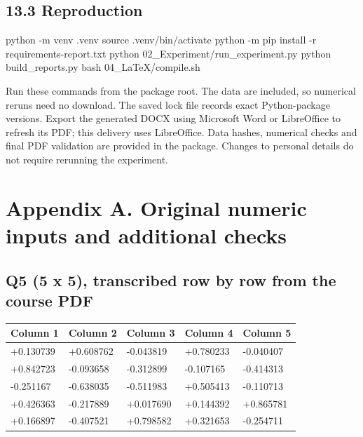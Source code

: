 \documentclass[a4paper,11pt]{article}
\begin{document}
\subsection*{13.3 Reproduction}
\begin{code}
python -m venv .venv
source .venv/bin/activate
python -m pip install -r requirements-report.txt
python 02_Experiment/run_experiment.py
python build_reports.py
bash 04_LaTeX/compile.sh
\end{code}
Run these commands from the package root. The data are included, so numerical reruns need no download. The saved lock file records exact Python-package versions. Export the generated DOCX using Microsoft Word or LibreOffice to refresh its PDF; this delivery uses LibreOffice. Data hashes, numerical checks and final PDF validation are provided in the package. Changes to personal details do not require rerunning the experiment.

\clearpage
\section*{Appendix A. Original numeric inputs and additional checks}
\subsection*{Q5 (5 x 5), transcribed row by row from the course PDF}
\begin{center}\fontsize{8.5}{10.5}\selectfont\begin{tabular}{@{}lllll@{}}\toprule
Column 1 & Column 2 & Column 3 & Column 4 & Column 5\\\midrule
+0.130739 & +0.608762 & -0.043819 & +0.780233 & -0.040407\\
+0.842723 & -0.093658 & -0.312899 & -0.107165 & -0.414313\\
-0.251167 & -0.638035 & -0.511983 & +0.505413 & -0.110713\\
+0.426363 & -0.217889 & +0.017690 & +0.144392 & +0.865781\\
+0.166897 & -0.407521 & +0.798582 & +0.321653 & -0.254711\\
\bottomrule\end{tabular}\end{center}
\end{document}
